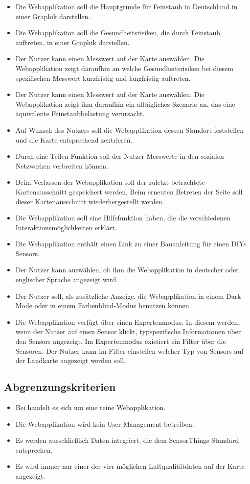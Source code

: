    \begin{itemize}
   	\item Die Webapplikation soll die Hauptgründe für Feinstaub in Deutschland in einer Graphik darstellen.
   	\item Die Webapplikation soll die Gesundheitsrisiken, die durch Feinstaub auftreten, in einer Graphik darstellen. 
	\item Der Nutzer kann einen Messwert auf der Karte auswählen. 
	Die Webapplikation zeigt daraufhin an welche Gesundheitsrisiken bei diesem spezifischen Messwert kurzfristig und langfristig auftreten.
	\item Der Nutzer kann einen Messwert auf der Karte auswählen. 
	Die Webapplikation zeigt ihm daraufhin ein alltägliches Szenario an, das eine äquivalente Feinstaubbelastung verursacht.
	\item Auf Wunsch des Nutzers soll die Webapplikation dessen Standort feststellen und die Karte entsprechend zentrieren.
	\item Durch eine Teilen-Funktion soll der Nutzer Messwerte in den sozialen Netzwerken verbreiten können.
	\item Beim Verlassen der Webapplikation soll der zuletzt betrachtete Kartenausschnitt gespeichert werden. Beim erneuten Betreten der Seite soll dieser Kartenausschnitt wiederhergestellt werden.
	\item Die Webapplikation soll eine Hilfefunktion haben, die die verschiedenen Interaktionsmöglichkeiten erklärt.
	\item Die Webapplikation enthält einen Link zu einer Bauanleitung für einen \glspl{DIY} \glspl{Sensor}.
	\item Der Nutzer kann auswählen, ob ihm die Webapplikation in deutscher oder englischer Sprache angezeigt wird.
	\item Der Nutzer soll, als zusätzliche Anzeige, die Webapplikation in einem Dark Mode oder in einem Farbenblind-Modus benutzen können.
	\item Die Webapplikation verfügt über einen Expertenmodus. In diesem werden, wenn der Nutzer auf einen Sensor klickt, typspezifische Informationen über den \glspl{Sensor} angezeigt.
	Im Expertenmodus existiert ein Filter über die Sensoren. Der Nutzer kann im Filter einstellen welcher Typ von \glspl{Sensor} auf der Landkarte angezeigt werden soll.        
\end{itemize}
\subsection{Abgrenzungskriterien}
    \begin{itemize}
	\item Bei \softwarename handelt es sich um eine reine Webapplikation.
	\item Die Webapplikation wird kein User Management betreiben.
	\item Es werden ausschließlich Daten integriert, die dem SensorThings Standard entsprechen.
	\item Es wird immer nur einer der vier möglichen Luftqualitätdaten auf der Karte angezeigt.
\end{itemize}